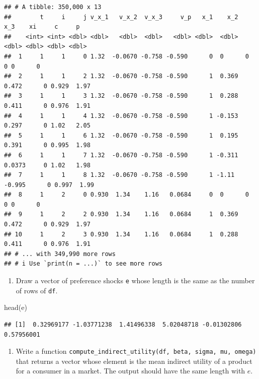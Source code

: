 \documentclass[
]{book}
\newenvironment{Shaded}{\begin{snugshade}}{\end{snugshade}}
\newcommand{\FunctionTok}[1]{\textcolor[rgb]{0.00,0.00,0.00}{#1}}
\newcommand{\NormalTok}[1]{#1}
\providecommand{\tightlist}{%
  \setlength{\itemsep}{0pt}\setlength{\parskip}{0pt}}
\begin{document}
\begin{verbatim}
## # A tibble: 350,000 x 13
##        t     i     j v_x_1   v_x_2  v_x_3     v_p   x_1    x_2     x_3    xi     c     p
##    <int> <int> <dbl> <dbl>   <dbl>  <dbl>   <dbl> <dbl>  <dbl>   <dbl> <dbl> <dbl> <dbl>
##  1     1     1     0 1.32  -0.0670 -0.758 -0.590      0  0      0          0 0      0   
##  2     1     1     2 1.32  -0.0670 -0.758 -0.590      1  0.369  0.472      0 0.929  1.97
##  3     1     1     3 1.32  -0.0670 -0.758 -0.590      1  0.288  0.411      0 0.976  1.91
##  4     1     1     4 1.32  -0.0670 -0.758 -0.590      1 -0.153  0.297      0 1.02   2.05
##  5     1     1     6 1.32  -0.0670 -0.758 -0.590      1  0.195  0.391      0 0.995  1.98
##  6     1     1     7 1.32  -0.0670 -0.758 -0.590      1 -0.311  0.0373     0 1.02   1.98
##  7     1     1     8 1.32  -0.0670 -0.758 -0.590      1 -1.11  -0.995      0 0.997  1.99
##  8     1     2     0 0.930  1.34    1.16   0.0684     0  0      0          0 0      0   
##  9     1     2     2 0.930  1.34    1.16   0.0684     1  0.369  0.472      0 0.929  1.97
## 10     1     2     3 0.930  1.34    1.16   0.0684     1  0.288  0.411      0 0.976  1.91
## # ... with 349,990 more rows
## # i Use `print(n = ...)` to see more rows
\end{verbatim}

\begin{enumerate}
\def\labelenumi{\arabic{enumi}.}
\setcounter{enumi}{5}
\tightlist
\item
  Draw a vector of preference shocks \texttt{e} whose length is the same as the number of rows of \texttt{df}.
\end{enumerate}

\begin{Shaded}
\begin{Highlighting}[]
\FunctionTok{head}\NormalTok{(e)}
\end{Highlighting}
\end{Shaded}

\begin{verbatim}
## [1]  0.32969177 -1.03771238  1.41496338  5.02048718 -0.01302806  0.57956001
\end{verbatim}

\begin{enumerate}
\def\labelenumi{\arabic{enumi}.}
\setcounter{enumi}{6}
\tightlist
\item
  Write a function \texttt{compute\_indirect\_utility(df,\ beta,\ sigma,\ mu,\ omega)} that returns a vector whose element is the mean indirect utility of a product for a consumer in a market. The output should have the same length with \(e\).
\end{enumerate}
\end{document}
